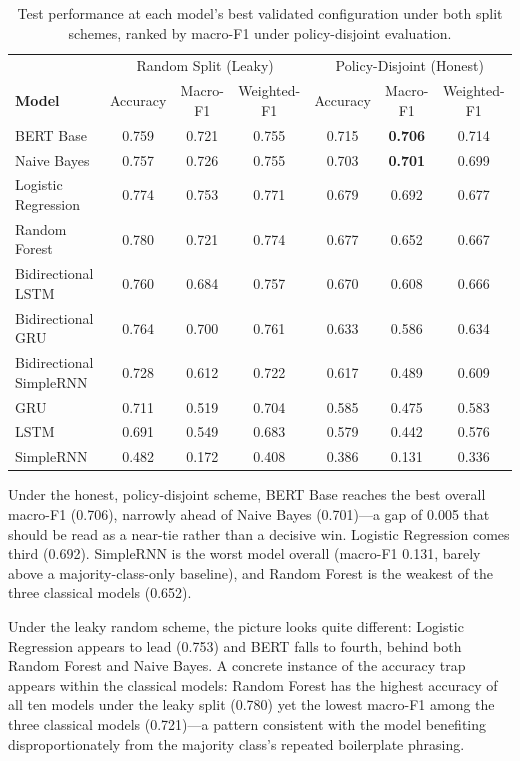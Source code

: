 \documentclass[11pt]{article}
\begin{document}
\begin{table}[t]
\centering
\small
\setlength{\tabcolsep}{3.5pt}
\begin{tabular}{@{}lccc@{\hspace{1em}}ccc@{}}
\toprule
 & \multicolumn{3}{c}{Random Split (Leaky)} & \multicolumn{3}{c}{Policy-Disjoint (Honest)} \\
\textbf{Model} & Accuracy & Macro-F1 & Weighted-F1 & Accuracy & Macro-F1 & Weighted-F1 \\
\midrule
BERT Base & 0.759 & 0.721 & 0.755 & 0.715 & \textbf{0.706} & 0.714 \\
Naive Bayes & 0.757 & 0.726 & 0.755 & 0.703 & \textbf{0.701} & 0.699 \\
Logistic Regression & 0.774 & 0.753 & 0.771 & 0.679 & 0.692 & 0.677 \\
Random Forest & 0.780 & 0.721 & 0.774 & 0.677 & 0.652 & 0.667 \\
Bidirectional LSTM & 0.760 & 0.684 & 0.757 & 0.670 & 0.608 & 0.666 \\
Bidirectional GRU & 0.764 & 0.700 & 0.761 & 0.633 & 0.586 & 0.634 \\
Bidirectional SimpleRNN & 0.728 & 0.612 & 0.722 & 0.617 & 0.489 & 0.609 \\
GRU & 0.711 & 0.519 & 0.704 & 0.585 & 0.475 & 0.583 \\
LSTM & 0.691 & 0.549 & 0.683 & 0.579 & 0.442 & 0.576 \\
SimpleRNN & 0.482 & 0.172 & 0.408 & 0.386 & 0.131 & 0.336 \\
\bottomrule
\end{tabular}
\caption{Test performance at each model's best validated configuration under both split schemes, ranked by macro-F1 under policy-disjoint evaluation.}
\label{tab:results}
\end{table}

Under the honest, policy-disjoint scheme, BERT Base reaches the best overall macro-F1 (0.706), narrowly ahead of Naive Bayes (0.701)---a gap of 0.005 that should be read as a near-tie rather than a decisive win. Logistic Regression comes third (0.692). SimpleRNN is the worst model overall (macro-F1 0.131, barely above a majority-class-only baseline), and Random Forest is the weakest of the three classical models (0.652).

Under the leaky random scheme, the picture looks quite different: Logistic Regression appears to lead (0.753) and BERT falls to fourth, behind both Random Forest and Naive Bayes. A concrete instance of the accuracy trap appears within the classical models: Random Forest has the highest accuracy of all ten models under the leaky split (0.780) yet the lowest macro-F1 among the three classical models (0.721)---a pattern consistent with the model benefiting disproportionately from the majority class's repeated boilerplate phrasing.
\end{document}
